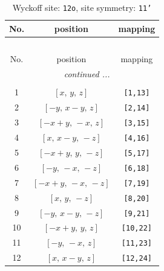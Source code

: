 \documentclass[fleqn,8pt]{jsarticle}
\begin{document}
\begin{longtable}{ccc}
\caption{Wyckoff site: {\tt 12o}, site symmetry: {\tt 11'}}
 \\
 \hline \hline
No. & position & mapping \\ \hline \endfirsthead

\multicolumn{2}{l}{\tablename\ \thetable{}} \\
 \hline \hline
No. & position & mapping \\ \hline \endhead

 \hline \hline
\multicolumn{2}{r}{\footnotesize\it continued ...} \\ \endfoot

 \hline \hline
\multicolumn{2}{r}{} \\ \endlastfoot

1 & $\left[ x,\, y,\, z \right]$ & {\tt [1,13]} \\ \hline
2 & $\left[ - y,\, x - y,\, z \right]$ & {\tt [2,14]} \\ \hline
3 & $\left[ - x + y,\, - x,\, z \right]$ & {\tt [3,15]} \\ \hline
4 & $\left[ x,\, x - y,\, - z \right]$ & {\tt [4,16]} \\ \hline
5 & $\left[ - x + y,\, y,\, - z \right]$ & {\tt [5,17]} \\ \hline
6 & $\left[ - y,\, - x,\, - z \right]$ & {\tt [6,18]} \\ \hline
7 & $\left[ - x + y,\, - x,\, - z \right]$ & {\tt [7,19]} \\ \hline
8 & $\left[ x,\, y,\, - z \right]$ & {\tt [8,20]} \\ \hline
9 & $\left[ - y,\, x - y,\, - z \right]$ & {\tt [9,21]} \\ \hline
10 & $\left[ - x + y,\, y,\, z \right]$ & {\tt [10,22]} \\ \hline
11 & $\left[ - y,\, - x,\, z \right]$ & {\tt [11,23]} \\ \hline
12 & $\left[ x,\, x - y,\, z \right]$ & {\tt [12,24]} \\
\end{longtable}
\end{document}
